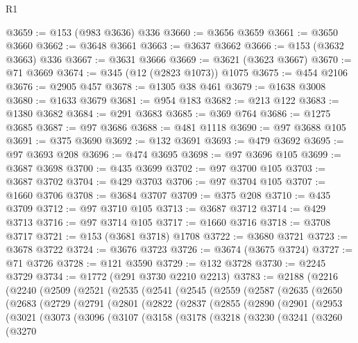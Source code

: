 \begin{lexlean}{R1}
\begin{coremodule}
@3659 := @153 (@983 @3636) @336
@3660 := @3656 @3659
@3661 := @3650 @3660
@3662 := @3648 @3661
@3663 := @3637 @3662
@3666 := @153 (@3632 @3663) @336
@3667 := @3631 @3666
@3669 := @3621 (@3623 @3667)
@3670 := @71 @3669
@3674 := @345 (@12 (@2823 @1073)) @1075
@3675 := @454 @2106
@3676 := @2905 @457
@3678 := @1305 @38 @461
@3679 := @1638 @3008
@3680 := @1633 @3679
@3681 := @954 @183
@3682 := @213 @122
@3683 := @1380 @3682
@3684 := @291 @3683
@3685 := @369 @764
@3686 := @1275 @3685
@3687 := @97 @3686
@3688 := @481 @1118
@3690 := @97 @3688 @105
@3691 := @375 @3690
@3692 := @132 @3691
@3693 := @479 @3692
@3695 := @97 @3693 @208
@3696 := @474 @3695
@3698 := @97 @3696 @105
@3699 := @3687 @3698
@3700 := @435 @3699
@3702 := @97 @3700 @105
@3703 := @3687 @3702
@3704 := @429 @3703
@3706 := @97 @3704 @105
@3707 := @1660 @3706
@3708 := @3684 @3707
@3709 := @375 @208
@3710 := @435 @3709
@3712 := @97 @3710 @105
@3713 := @3687 @3712
@3714 := @429 @3713
@3716 := @97 @3714 @105
@3717 := @1660 @3716
@3718 := @3708 @3717
@3721 := @153 (@3681 @3718) @1708
@3722 := @3680 @3721
@3723 := @3678 @3722
@3724 := @3676 @3723
@3726 := @3674 (@3675 @3724)
@3727 := @71 @3726
@3728 := @121 @3590
@3729 := @132 @3728
@3730 := @2245 @3729
@3734 := @1772 (@291 @3730 @2210 @2213)
@3783 := @2188
    (@2216
      (@2240
        (@2509
          (@2521
            (@2535
              (@2541
                (@2545
                  (@2559
                    (@2587
                      (@2635
                        (@2650
                          (@2683
                            (@2729
                              (@2791
                                (@2801
                                  (@2822
                                    (@2837
                                      (@2855
                                        (@2890
                                          (@2901
                                            (@2953
                                              (@3021
                                                (@3073
                                                  (@3096
                                                    (@3107
                                                      (@3158
                                                        (@3178
                                                          (@3218
                                                            (@3230
                                                              (@3241
                                                                (@3260
                                                                  (@3270

\end{coremodule}
\end{lexlean}
